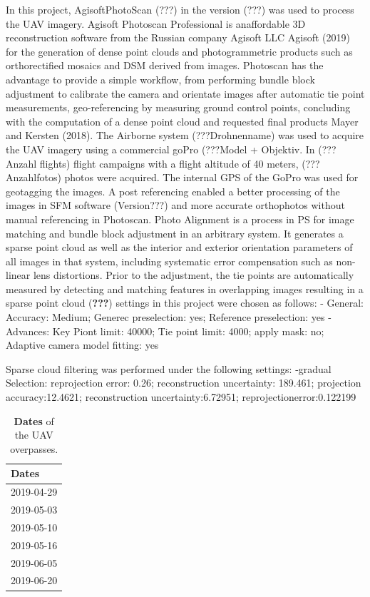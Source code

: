 \documentclass[]{article}
\begin{document}
In this project, AgisoftPhotoScan (???) in the version (???) was used to
process the UAV imagery. Agisoft Photoscan Professional is anaffordable
3D reconstruction software from the Russian company Agisoft LLC Agisoft
(2019) for the generation of dense point clouds and photogrammetric
products such as orthorectified mosaics and DSM derived from images.
Photoscan has the advantage to provide a simple workflow, from
performing bundle block adjustment to calibrate the camera and orientate
images after automatic tie point measurements, geo-referencing by
measuring ground control points, concluding with the computation of a
dense point cloud and requested final products Mayer and Kersten (2018).
The Airborne system (???Drohnenname) was used to acquire the UAV imagery
using a commercial goPro (???Model + Objektiv. In (??? Anzahl flights)
flight campaigns with a flight altitude of 40 meters, (???Anzahlfotos)
photos were acquired. The internal GPS of the GoPro was used for
geotagging the images. A post referencing enabled a better processing of
the images in SFM software (Version???) and more accurate orthophotos
without manual referencing in Photoscan. Photo Alignment is a process in
PS for image matching and bundle block adjustment in an arbitrary
system. It generates a sparse point cloud as well as the interior and
exterior orientation parameters of all images in that system, including
systematic error compensation such as non-linear lens distortions. Prior
to the adjustment, the tie points are automatically measured by
detecting and matching features in overlapping images resulting in a
sparse point cloud ({\textbf{???}}) settings in this project were chosen
as follows: - General: Accuracy: Medium; Generec preselection: yes;
Reference preselection: yes - Advances: Key Piont limit: 40000; Tie
point limit: 4000; apply mask: no; Adaptive camera model fitting: yes

Sparse cloud filtering was performed under the following settings:
-gradual Selection: reprojection error: 0.26; reconstruction
uncertainty: 189.461; projection accuracy:12.4621; reconstruction
uncertainty:6.72951; reprojectionerror:0.122199

\begin{table}[!h]

\caption{\label{tab:dates-table}\textbf{Dates} of the UAV overpasses.}
\centering
\begin{tabular}[t]{l}
\toprule
Dates\\
\midrule
2019-04-29\\
2019-05-03\\
2019-05-10\\
2019-05-16\\
2019-06-05\\
2019-06-20\\
\bottomrule
\end{tabular}
\end{table}
\end{document}
